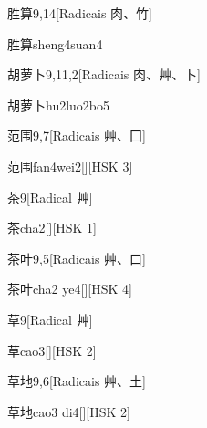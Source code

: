 \begin{entry}{胜算}{9,14}[Radicais ⾁、⽵]
  \begin{phonetics}{胜算}{sheng4suan4}
  \end{phonetics}
\end{entry}

\begin{entry}{胡萝卜}{9,11,2}[Radicais ⾁、⾋、⼘]
  \begin{phonetics}{胡萝卜}{hu2luo2bo5}
  \end{phonetics}
\end{entry}

\begin{entry}{范围}{9,7}[Radicais ⾋、⼞]
  \begin{phonetics}{范围}{fan4wei2}[][HSK 3]
  \end{phonetics}
\end{entry}

\begin{entry}{茶}{9}[Radical ⾋]
  \begin{phonetics}{茶}{cha2}[][HSK 1]
  \end{phonetics}
\end{entry}

\begin{entry}{茶叶}{9,5}[Radicais ⾋、⼝]
  \begin{phonetics}{茶叶}{cha2 ye4}[][HSK 4]
  \end{phonetics}
\end{entry}

\begin{entry}{草}{9}[Radical ⾋]
  \begin{phonetics}{草}{cao3}[][HSK 2]
  \end{phonetics}
\end{entry}

\begin{entry}{草地}{9,6}[Radicais ⾋、⼟]
  \begin{phonetics}{草地}{cao3 di4}[][HSK 2]
  \end{phonetics}
\end{entry}


